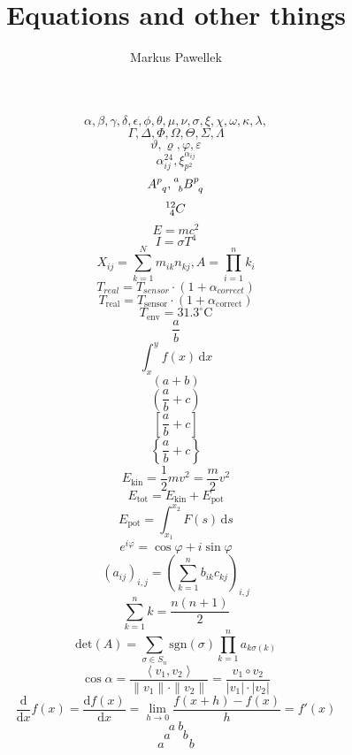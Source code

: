 \documentclass{article}
\title{Equations and other things}
\author{Markus Pawellek}
\begin{document}
  \maketitle

  \[
    \alpha, \beta, \gamma, \delta, \epsilon, \phi, \theta, \mu, \nu, \sigma, \xi, \chi, \omega, \kappa, \lambda,
  \]
  \[
    \Gamma, \Delta, \Phi, \Omega, \Theta, \Sigma, \Lambda
  \]
  \[
    \vartheta, \varrho, \varphi, \varepsilon
  \]
  \[
    \alpha_{ij}^{24}, \xi^{\alpha_{ij}}_{p^2}
  \]
  \[
    \tensor{A}{^p_q}, \tensor[^a_b]{B}{^p_q}
  \]
  \[
    \tensor*[^{12}_4]{C}{}
  \]
  \[
    E = mc^2
  \]
  \[
    I = \sigma T^4
  \]
  \[
    X_{ij} = \sum_{k=1}^N m_{ik}n_{kj}, A = \prod_{i = 1}^n k_i
  \]
  \[
    T_{real} = T_{sensor}\cdot ( 1 + \alpha_{correct} )
  \]
  \[
    T_\mathrm{real} = T_\mathrm{sensor}\cdot ( 1 + \alpha_\mathrm{correct} )
  \]
  \[
    T_\mathrm{env} = 31.3^\circ \mathrm{C}
  \]
  \[
    \frac{a}{b}
  \]
  \[
    \int_x^y f(x)\, \mathrm{d}x
  \]
  \[
    (a+b)
  \]
  \[
    \left(\frac{a}{b} + c\right)
  \]
  \[
    \left[\frac{a}{b} + c\right]
  \]
  \[
    \left\{\frac{a}{b} + c\right\}
  \]
  \[
    E_\mathrm{kin} = \frac{1}{2}mv^2 = \frac{m}{2}v^2
  \]
  \[
    E_\mathrm{tot} = E_\mathrm{kin} + E_\mathrm{pot}
  \]
  \[
    E_\mathrm{pot} = \int_{x_1}^{x_2} F(s)\, \mathrm{d}s
  \]
  \[
    e^{i\varphi} = \cos\varphi + i \sin\varphi
  \]
  \[
    \left( a_{ij} \right)_{i,j} = \left( \sum_{k=1}^n b_{ik}c_{kj} \right)_{i,j}
  \]
  \[
    \sum_{k=1}^n k = \frac{n(n+1)}{2}
  \]
  \[
    \mathrm{det}(A) = \sum_{\sigma \in S_n} \mathrm{sgn}(\sigma) \prod_{k=1}^n a_{k\sigma(k)}
  \]
  \[
    \cos\alpha
    = \frac{\left\langle v_1,v_2 \right\rangle}{ \| v_1 \| \cdot \| v_2 \| }
    = \frac{v_1 \circ v_2}{|v_1|\cdot|v_2|}
  \]
  \[
    \frac{\mathrm{d}}{\mathrm{d}x} f(x) = \frac{\mathrm{d}f(x)}{\mathrm{d}x}
    = \lim_{h\to 0} \frac{f(x+h)-f(x)}{h}
    = f'(x)
  \]
  \[
    a \ b
  \]
  \[
    a \quad b
  \]
  \[
    a \qquad b
  \]
\end{document}
